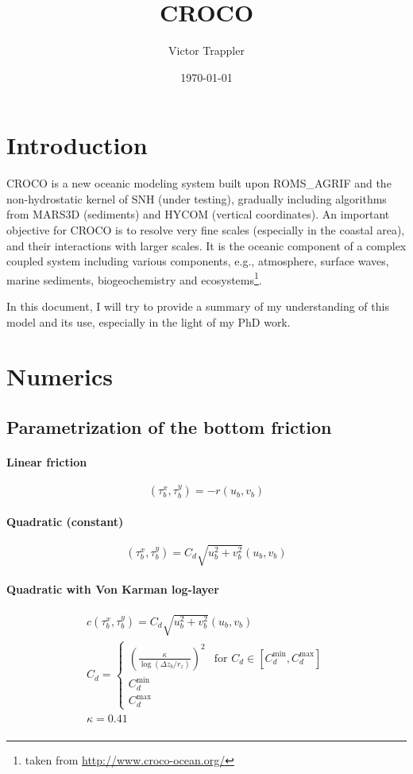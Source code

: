 \documentclass{article}
\author{Victor Trappler}
\title{CROCO}
\date{\today}
\begin{document}
\maketitle

\section*{Introduction}

CROCO is a new oceanic modeling system built upon ROMS\_AGRIF and the non-hydrostatic kernel of SNH (under testing), gradually including algorithms from MARS3D (sediments)  and HYCOM (vertical coordinates). An important objective for CROCO is to resolve very fine scales (especially in the coastal area), and their interactions with larger scales. It is the oceanic component of a complex coupled system including various components, e.g., atmosphere, surface waves, marine sediments, biogeochemistry and ecosystems\footnote{taken from \url{http://www.croco-ocean.org/}}.

In this document, I will try to provide a summary of my understanding of this model and its use, especially in the light of my PhD work.
\section{Numerics}
\subsection{Parametrization of the bottom friction}
\paragraph{Linear friction}
\begin{equation}
  \label{eq:linear_friction}
  (\tau_b^x, \tau_b^y) = -r (u_b, v_b)
\end{equation}
\paragraph{Quadratic (constant)}
\begin{equation}
  \label{eq:quadratic_friction_constant}
  (\tau_b^x, \tau_b^y) = C_d \sqrt{u_b^2 + v_b^2}(u_b, v_b)
\end{equation}
\paragraph{Quadratic with Von Karman log-layer}
\begin{align}c
  \label{eq:quadratic_friction_vonkarman}
  (\tau_b^x, \tau_b^y) = C_d \sqrt{u_b^2 + v_b^2}(u_b, v_b) \\  
  C_d = \left\{\begin{array}{ll}
                 {\left(\frac{\kappa}{\log({\Delta z_b}/{r_z})}\right)}^2 & \text{for } C_d \in [C_d^{\min}, C_d^{\max}] \\
                 C_d^{\min} & \\
                 C_d^{\max}
       \end{array}
  \right. \\
  \kappa=0.41 \\  
\end{align}
\end{document}
